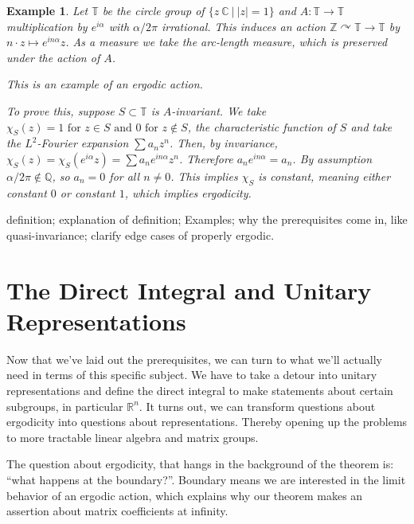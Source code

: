 \documentclass[
  12pt
]{article}
\theoremstyle{break}
\theoremstyle{plain}
\newtheorem*{ex}{Example}
\newcommand{\bbr}{\ensuremath{\mathbb{R}}}
\newcommand{\bbc}{\ensuremath{\mathbb{C}}}
\begin{document}
  \begin{ex}
    Let $\mathbb{T}$ be the circle group of $\{z\ \bbc \ | \ |z| = 1 \}$ and
    $A: \mathbb{T} \rightarrow \mathbb{T}$ multiplication by $e^{i\alpha}$ with
    $\alpha/2\pi$ irrational. This induces an action
    $\mathbb{Z}\curvearrowright\mathbb{T} \rightarrow \mathbb{T}$ by $ n\cdot z
    \mapsto e^{in\alpha}z$. As a measure we take the arc-length measure, which
    is preserved under the action of $A$.

    This is an example of an ergodic action.

    To prove this, suppose $S \subset \mathbb{T}$ is $A$-invariant. We take
    $\chi_S(z) = 1 \text{ for } z\in S \text{ and } 0 \text{ for } z \notin S$,
    the characteristic function of $S$ and take the $L^2$-Fourier expansion
    $\sum a_n z^n$. Then, by invariance, $\chi_S(z) = \chi_S(e^{i\alpha}z) =
    \sum a_n e^{in\alpha}z^n$. Therefore $a_ne^{in\alpha} = a_n$. By assumption
    $\alpha/2\pi \notin \mathbb{Q}$, so $a_n = 0$ for all $n \neq 0$. This
    implies $\chi_S$ is constant, meaning either constant $0$ or constant $1$,
    which implies ergodicity.
  \end{ex}
  definition; explanation of definition; Examples; why the prerequisites
  come in, like quasi-invariance; clarify edge cases of properly ergodic.




\hypertarget{the-direct-integral-and-unitary-representations}{%
\section{The Direct Integral and Unitary Representations}\label{the-direct-integral-and-unitary-representations}}


  Now that we've laid out the prerequisites, we can turn to what we'll actually need in terms of this specific subject.
  We have to take a detour into unitary
  representations and define the direct integral to make statements about
  certain subgroups, in particular $\bbr^n$.
  It turns out, we can transform questions about ergodicity into questions about representations.
  Thereby opening up the problems to more tractable linear algebra and matrix groups.

  The question about ergodicity, that hangs in the background of the theorem is:
  ``what happens at the boundary?''. Boundary means we are interested in the limit behavior of an ergodic action, which explains why our theorem makes an assertion about matrix coefficients at infinity.
\end{document}
